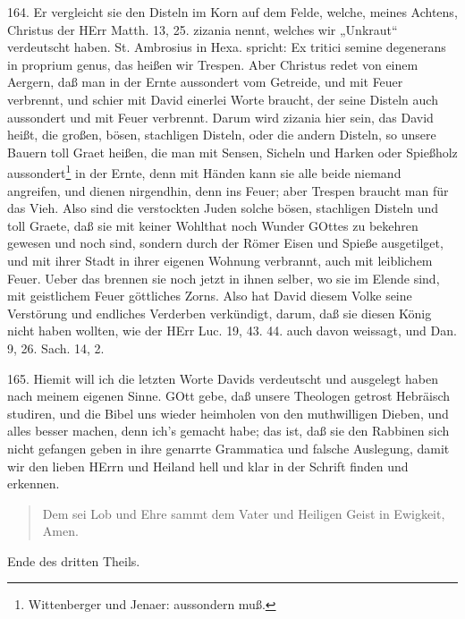 164. Er vergleicht sie den Disteln im Korn auf dem Felde, welche, meines Achtens, Christus der HErr Matth. 13, 25. zizania nennt, welches wir „Unkraut“ verdeutscht haben. St. Ambrosius in Hexa. spricht: Ex tritici semine degenerans in proprium genus, das heißen wir Trespen. Aber Christus redet von einem Aergern, daß man in der Ernte aussondert vom Getreide, und mit Feuer verbrennt, und schier mit David einerlei Worte braucht, der seine Disteln auch aussondert und mit Feuer verbrennt. Darum wird zizania hier sein, das David  heißt, die großen, bösen, stachligen Disteln, oder die andern Disteln, so unsere Bauern toll Graet heißen, die man mit Sensen, Sicheln und Harken oder Spießholz aussondert\footnote{Wittenberger und Jenaer: aussondern muß.} in der Ernte, denn mit Händen kann sie alle beide niemand angreifen, und dienen nirgendhin, denn ins Feuer; aber Trespen braucht man für das Vieh. Also sind die verstockten Juden solche bösen, stachligen Disteln und toll Graete, daß sie mit keiner Wohlthat noch Wunder GOttes zu bekehren gewesen und noch sind, sondern durch der Römer Eisen und Spieße ausgetilget, und mit ihrer Stadt in ihrer eigenen Wohnung verbrannt, auch mit leiblichem Feuer. Ueber das brennen sie noch jetzt in ihnen selber, wo sie im Elende sind, mit geistlichem Feuer göttliches Zorns. Also hat David diesem Volke seine Verstörung und endliches Verderben verkündigt, darum, daß sie diesen König nicht haben wollten, wie der HErr Luc. 19, 43. 44. auch davon weissagt, und Dan. 9, 26. Sach. 14, 2.

165. Hiemit will ich die letzten Worte Davids verdeutscht und ausgelegt haben nach meinem eigenen Sinne. GOtt gebe, daß unsere Theologen getrost Hebräisch studiren, und die Bibel uns wieder heimholen von den muthwilligen Dieben, und alles besser machen, denn ich’s gemacht habe; das ist, daß sie den Rabbinen sich nicht gefangen geben in ihre genarrte Grammatica und falsche Auslegung, damit wir den lieben HErrn und Heiland hell und klar in der Schrift finden und erkennen.

\begin{quote}
Dem sei Lob und Ehre sammt dem Vater und Heiligen Geist in Ewigkeit, Amen.
\end{quote}

Ende des dritten Theils.
